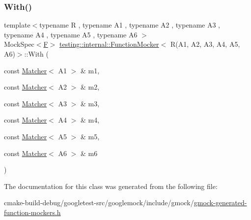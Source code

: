 \subsubsection{\texorpdfstring{With()}{With()}}
{\footnotesize\ttfamily template$<$typename R , typename A1 , typename A2 , typename A3 , typename A4 , typename A5 , typename A6 $>$ \\
Mock\+Spec$<$\mbox{\hyperlink{classtesting_1_1internal_1_1FunctionMocker_3_01R_07A1_00_01A2_00_01A3_00_01A4_00_01A5_00_01A6_08_4_a5373cd66051f0a54e83b0497004df058}{F}}$>$ \mbox{\hyperlink{classtesting_1_1internal_1_1FunctionMocker}{testing\+::internal\+::\+Function\+Mocker}}$<$ R(A1, A2, A3, A4, A5, A6)$>$\+::With (\begin{DoxyParamCaption}\item[{const \mbox{\hyperlink{classtesting_1_1Matcher}{Matcher}}$<$ A1 $>$ \&}]{m1,  }\item[{const \mbox{\hyperlink{classtesting_1_1Matcher}{Matcher}}$<$ A2 $>$ \&}]{m2,  }\item[{const \mbox{\hyperlink{classtesting_1_1Matcher}{Matcher}}$<$ A3 $>$ \&}]{m3,  }\item[{const \mbox{\hyperlink{classtesting_1_1Matcher}{Matcher}}$<$ A4 $>$ \&}]{m4,  }\item[{const \mbox{\hyperlink{classtesting_1_1Matcher}{Matcher}}$<$ A5 $>$ \&}]{m5,  }\item[{const \mbox{\hyperlink{classtesting_1_1Matcher}{Matcher}}$<$ A6 $>$ \&}]{m6 }\end{DoxyParamCaption})\hspace{0.3cm}{\ttfamily [inline]}}



The documentation for this class was generated from the following file\+:\begin{DoxyCompactItemize}
\item 
cmake-\/build-\/debug/googletest-\/src/googlemock/include/gmock/\mbox{\hyperlink{gmock-generated-function-mockers_8h}{gmock-\/generated-\/function-\/mockers.\+h}}\end{DoxyCompactItemize}
